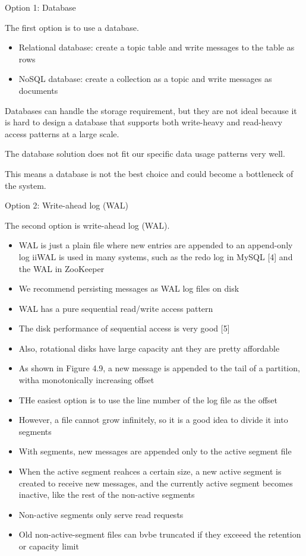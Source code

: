 \documentclass{report}
\theoremstyle{definition}
\begin{document}
Option 1: Database

The first option is to use a database.

\begin{itemize}
\item
Relational database: create a topic table and write messages to the table as rows
\item
NoSQL database: create a collection as a topic and write messages as documents
\end{itemize}

Databases can handle the storage requirement, but they are not ideal because it is hard to design a database that supports both write-heavy and read-heavy access patterns at a large scale.

The database solution does not fit our specific data usage patterns very well.

This means a database is not the best choice and could become a bottleneck of the system.


Option 2: Write-ahead log (WAL)

The second option is write-ahead log (WAL).

\begin{itemize}
\item
WAL is just a plain file where new entries are appended to an append-only log
iiWAL  is used in many systems, such as the redo log in MySQL [4] and the WAL in ZooKeeper
\item
We recommend persisting messages as WAL log files on disk
\item
WAL has a pure sequential read/write access pattern
\item
The disk performance of sequential access is very good [5]
\item
Also, rotational disks have large capacity ant they are pretty affordable
\item
As shown in Figure 4.9, a new message is appended to the tail of a partition, witha monotonically increasing offset
\item
THe easiest option is to use the line number of the log file as the offset
\item
However, a file cannot grow infinitely, so it is a good idea to divide it into segments
\item
With segments, new messages are appended only to the active segment file
\item
When the active segment reahces a certain size, a new active segment is created to receive new messages, and the currently active segment becomes inactive, like the rest of the non-active segments
\item
Non-active segments only serve read requests
\item
Old non-active-segment files can bvbe truncated if they exceeed the retention or capacity limit
\end{itemize}
\end{document}
